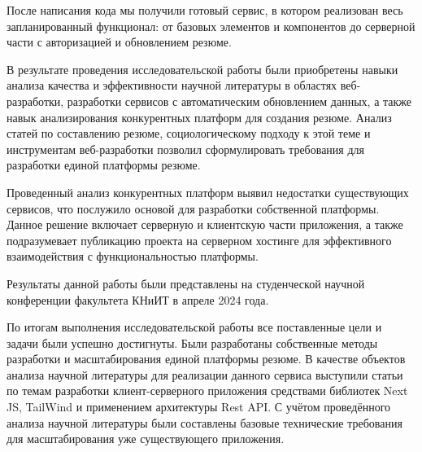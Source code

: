 \documentclass[master, och, diploma]{SCWorks}
\begin{document}
После написания кода мы получили готовый сервис, в котором реализован весь запланированный функционал: от базовых элементов и компонентов до серверной части с авторизацией и обновлением резюме.






\newpage
\conclusion
В результате проведения исследовательской работы были приобретены навыки анализа качества и эффективности научной литературы в областях веб-разработки, разработки сервисов с автоматическим обновлением данных, а также навык анализирования конкурентных платформ для создания резюме. Анализ статей по составлению резюме, социологическому подходу к этой теме и инструментам веб-разработки позволил сформулировать требования для разработки единой платформы резюме.

Проведенный анализ конкурентных платформ выявил недостатки существующих сервисов, что послужило основой для разработки собственной платформы. Данное решение включает серверную и клиентскую части приложения, а также подразумевает публикацию проекта на серверном хостинге для эффективного взаимодействия с функциональностью платформы.

Результаты данной работы были представлены на студенческой научной конференции факультета КНиИТ в апреле 2024 года.

По итогам выполнения исследовательской работы все поставленные цели и задачи были успешно достигнуты. Были разработаны собственные методы разработки и масштабирования единой платформы резюме. В качестве объектов анализа научной литературы для реализации данного сервиса выступили статьи по темам разработки клиент-серверного приложения средствами библиотек Next JS, TailWind и применением архитектуры Rest API. С учётом проведённого анализа научной литературы были составлены базовые технические требования для масштабирования уже существующего приложения. 






%




\end{document}
